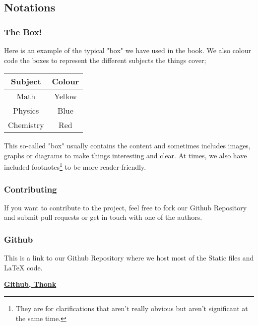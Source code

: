 \subsection{Notations}
\subsubsection{The Box!}
Here is an example of the typical "box" we have used in the book. We also colour code the boxes to represent the different subjects the things cover;
\begin{center}
\begin{tabular}{|c|c|}
\hline
Subject & Colour\\
\hline
Math & Yellow\\
Physics & Blue\\
Chemistry & Red\\
\hline
\end{tabular}
\end{center}
\begin{guidebox}{}
{This so-called "box" usually contains the content and sometimes includes images, graphs or diagrams to make things interesting and clear. At times, we also have included footnotes\footnote{They are for clarifications that aren't really obvious but aren't significant at the same time.} to be more reader-friendly.}
\end{guidebox}
\subsubsection{Contributing}
If you want to contribute to the project, feel free to fork our Github Repository and submit pull requests or get in touch with one of the authors.
\subsubsection{Github}
This is a link to our Github Repository where we host most of the Static files and LaTeX code.
\begin{flushleft}
\color{blue}
\textbf{\href{https://github.com/Psi25Omega/Thonk-M-P-C}{Github, Thonk}}
\end{flushleft}
\newpage


